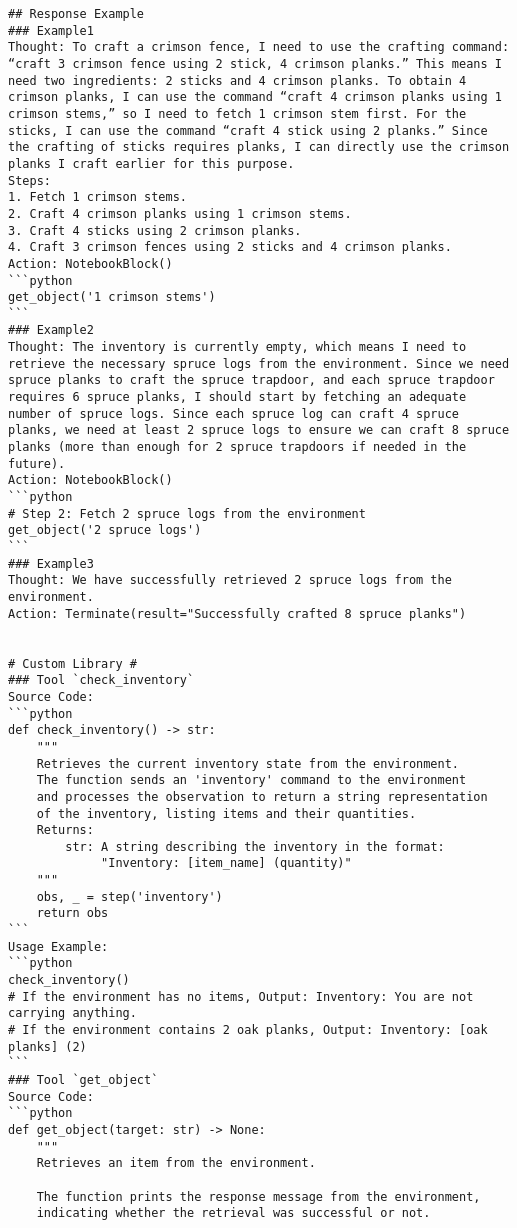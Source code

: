 \begin{tcolorbox}[title=Prompt on TextCraft, breakable, width=\textwidth,top=0mm]
\begin{Verbatim}[breaklines, fontsize=\footnotesize]
## Response Example
### Example1
Thought: To craft a crimson fence, I need to use the crafting command: “craft 3 crimson fence using 2 stick, 4 crimson planks.” This means I need two ingredients: 2 sticks and 4 crimson planks. To obtain 4 crimson planks, I can use the command “craft 4 crimson planks using 1 crimson stems,” so I need to fetch 1 crimson stem first. For the sticks, I can use the command “craft 4 stick using 2 planks.” Since the crafting of sticks requires planks, I can directly use the crimson planks I craft earlier for this purpose.
Steps: 
1. Fetch 1 crimson stems.
2. Craft 4 crimson planks using 1 crimson stems.
3. Craft 4 sticks using 2 crimson planks.
4. Craft 3 crimson fences using 2 sticks and 4 crimson planks.
Action: NotebookBlock()
```python
get_object('1 crimson stems')
```
### Example2
Thought: The inventory is currently empty, which means I need to retrieve the necessary spruce logs from the environment. Since we need spruce planks to craft the spruce trapdoor, and each spruce trapdoor requires 6 spruce planks, I should start by fetching an adequate number of spruce logs. Since each spruce log can craft 4 spruce planks, we need at least 2 spruce logs to ensure we can craft 8 spruce planks (more than enough for 2 spruce trapdoors if needed in the future).
Action: NotebookBlock()
```python
# Step 2: Fetch 2 spruce logs from the environment
get_object('2 spruce logs')
```
### Example3
Thought: We have successfully retrieved 2 spruce logs from the environment. 
Action: Terminate(result="Successfully crafted 8 spruce planks")


# Custom Library #
### Tool `check_inventory`
Source Code:
```python
def check_inventory() -> str:
    """
    Retrieves the current inventory state from the environment.
    The function sends an 'inventory' command to the environment
    and processes the observation to return a string representation
    of the inventory, listing items and their quantities.
    Returns:
        str: A string describing the inventory in the format:
             "Inventory: [item_name] (quantity)"
    """
    obs, _ = step('inventory')
    return obs
```
Usage Example:
```python
check_inventory() 
# If the environment has no items, Output: Inventory: You are not carrying anything.
# If the environment contains 2 oak planks, Output: Inventory: [oak planks] (2)
```
### Tool `get_object`
Source Code:
```python
def get_object(target: str) -> None:
    """
    Retrieves an item from the environment.

    The function prints the response message from the environment, 
    indicating whether the retrieval was successful or not.


\end{Verbatim}
\end{tcolorbox}
